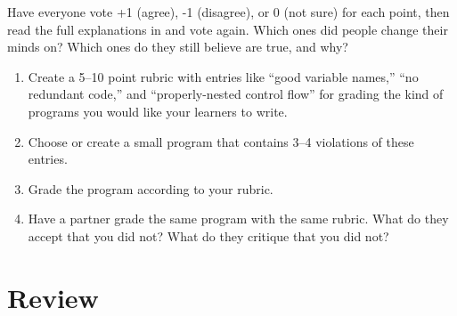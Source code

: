 Have everyone vote +1 (agree), -1 (disagree), or 0 (not sure) for each point,
then read the full explanations in
and vote again.
Which ones did people change their minds on?
Which ones do they still believe are true, and why?


\begin{enumerate}

\item
  Create a 5--10 point rubric
  with entries like ``good variable names,'' ``no redundant code,'' and ``properly-nested control flow''
  for grading the kind of programs you would like your learners to write.

\item
  Choose or create a small program that contains 3--4 violations of these entries.

\item
  Grade the program according to your rubric.

\item
  Have a partner grade the same program with the same rubric.
  What do they accept that you did not?
  What do they critique that you did not?

\end{enumerate}

\section*{Review}

